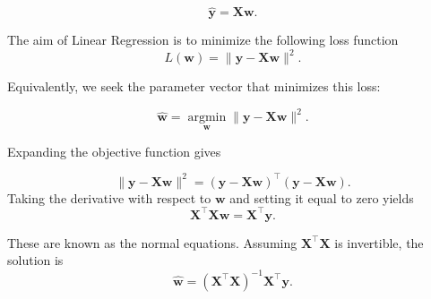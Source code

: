 \documentclass[14pt]{extarticle}
\begin{document}
\[
\hat{\mathbf{y}} = \mathbf{X}\mathbf{w}.
\]

The aim of Linear Regression is to minimize the following loss function
\[
L(\mathbf{w}) =
\|\mathbf{y} - \mathbf{X}\mathbf{w}\|^2.
\]

Equivalently, we seek the parameter vector that minimizes this loss:

\[
\hat{\mathbf{w}} = \operatorname*{argmin}_{\mathbf{w}}\|\mathbf{y} - \mathbf{X}\mathbf{w}\|^2.
\]

Expanding the objective function gives

\[
\|\mathbf{y} - \mathbf{X}\mathbf{w}\|^2 = (\mathbf{y}-\mathbf{X}\mathbf{w})^\top(\mathbf{y}-\mathbf{X}\mathbf{w}).
\]
Taking the derivative with respect to $\mathbf{w}$ and setting it equal to zero yields
\[
\mathbf{X}^\top \mathbf{X}\mathbf{w} = \mathbf{X}^\top \mathbf{y}.
\]

These are known as the normal equations. Assuming $\mathbf{X}^\top\mathbf{X}$ is invertible, the solution is
\[
\hat{\mathbf{w}} = (\mathbf{X}^\top\mathbf{X})^{-1}\mathbf{X}^\top\mathbf{y}.
\]
\end{document}

